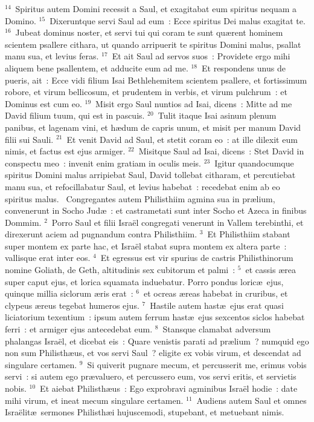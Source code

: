 ${}^{14}$~Spiritus autem Domini recessit a Saul, et exagitabat eum spiritus nequam a Domino.
${}^{15}$~Dixeruntque servi Saul ad eum~: Ecce spiritus Dei malus exagitat te.
${}^{16}$~Jubeat dominus noster, et servi tui qui coram te sunt qu\ae rent hominem scientem psallere cithara, ut quando arripuerit te spiritus Domini malus, psallat manu sua, et levius feras.
${}^{17}$~Et ait Saul ad servos suos~: Providete ergo mihi aliquem bene psallentem, et adducite eum ad me.
${}^{18}$~Et respondens unus de pueris, ait~: Ecce vidi filium Isai Bethlehemitem scientem psallere, et fortissimum robore, et virum bellicosum, et prudentem in verbis, et virum pulchrum~: et Dominus est cum eo.
${}^{19}$~Misit ergo Saul nuntios ad Isai, dicens~: Mitte ad me David filium tuum, qui est in pascuis.
${}^{20}$~Tulit itaque Isai asinum plenum panibus, et lagenam vini, et h\ae dum de capris unum, et misit per manum David filii sui Sauli.
${}^{21}$~Et venit David ad Saul, et stetit coram eo~: at ille dilexit eum nimis, et factus est ejus armiger.
${}^{22}$~Misitque Saul ad Isai, dicens~: Stet David in conspectu meo~: invenit enim gratiam in oculis meis.
${}^{23}$~Igitur quandocumque spiritus Domini malus arripiebat Saul, David tollebat citharam, et percutiebat manu sua, et refocillabatur Saul, et levius habebat~: recedebat enim ab eo spiritus malus.
~Congregantes autem Philisthiim agmina sua in pr\ae lium, convenerunt in Socho Jud\ae~: et castrametati sunt inter Socho et Azeca in finibus Dommim.
${}^{2}$~Porro Saul et filii Isra\"el congregati venerunt in Vallem terebinthi, et direxerunt aciem ad pugnandum contra Philisthiim.
${}^{3}$~Et Philisthiim stabant super montem ex parte hac, et Isra\"el stabat supra montem ex altera parte~: vallisque erat inter eos.
${}^{4}$~Et egressus est vir spurius de castris Philisthinorum nomine Goliath, de Geth, altitudinis sex cubitorum et palmi~:
${}^{5}$~et cassis \ae rea super caput ejus, et lorica squamata induebatur. Porro pondus loric\ae\ ejus, quinque millia siclorum \ae ris erat~:
${}^{6}$~et ocreas \ae reas habebat in cruribus, et clypeus \ae reus tegebat humeros ejus.
${}^{7}$~Hastile autem hast\ae\ ejus erat quasi liciatorium texentium~: ipsum autem ferrum hast\ae\ ejus sexcentos siclos habebat ferri~: et armiger ejus antecedebat eum.
${}^{8}$~Stansque clamabat adversum phalangas Isra\"el, et dicebat eis~: Quare venistis parati ad pr\ae lium~? numquid ego non sum Philisth\ae us, et vos servi Saul~? eligite ex vobis virum, et descendat ad singulare certamen.
${}^{9}$~Si quiverit pugnare mecum, et percusserit me, erimus vobis servi~: si autem ego pr\ae valuero, et percussero eum, vos servi eritis, et servietis nobis.
${}^{10}$~Et aiebat Philisth\ae us~: Ego exprobravi agminibus Isra\"el hodie~: date mihi virum, et ineat mecum singulare certamen.
${}^{11}$~Audiens autem Saul et omnes Isra\"elit\ae\ sermones Philisth\ae i hujuscemodi, stupebant, et metuebant nimis.


